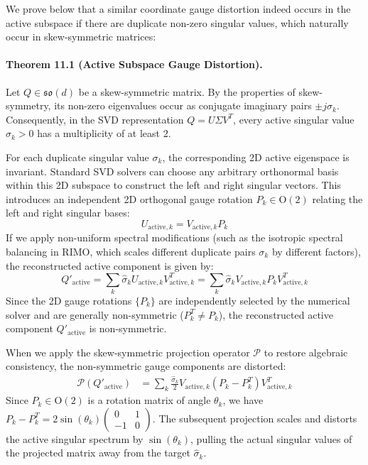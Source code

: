 We prove below that a similar coordinate gauge distortion indeed occurs in the active subspace if there are duplicate non-zero singular values, which naturally occur in skew-symmetric matrices:
\paragraph{Theorem 11.1 (Active Subspace Gauge Distortion).}
Let $Q \in \mathfrak{so}(d)$ be a skew-symmetric matrix. By the properties of skew-symmetry, its non-zero eigenvalues occur as conjugate imaginary pairs $\pm j \sigma_k$. Consequently, in the SVD representation $Q = U \Sigma V^T$, every active singular value $\sigma_k > 0$ has a multiplicity of at least $2$. 

For each duplicate singular value $\sigma_k$, the corresponding 2D active eigenspace is invariant. Standard SVD solvers can choose any arbitrary orthonormal basis within this 2D subspace to construct the left and right singular vectors. This introduces an independent 2D orthogonal gauge rotation $P_k \in \mathrm{O}(2)$ relating the left and right singular bases:
\begin{equation}
U_{\text{active}, k} = V_{\text{active}, k} P_k
\end{equation}
If we apply non-uniform spectral modifications (such as the isotropic spectral balancing in RIMO, which scales different duplicate pairs $\sigma_k$ by different factors), the reconstructed active component is given by:
\begin{equation}
Q'_{\text{active}} = \sum_k \hat{\sigma}_k U_{\text{active}, k} V_{\text{active}, k}^T = \sum_k \hat{\sigma}_k V_{\text{active}, k} P_k V_{\text{active}, k}^T
\end{equation}
Since the 2D gauge rotations $\{P_k\}$ are independently selected by the numerical solver and are generally non-symmetric ($P_k^T \ne P_k$), the reconstructed active component $Q'_{\text{active}}$ is non-symmetric. 

When we apply the skew-symmetric projection operator $\mathcal{P}$ to restore algebraic consistency, the non-symmetric gauge components are distorted:
\begin{align}
\mathcal{P}(Q'_{\text{active}}) &= \sum_k \frac{\hat{\sigma}_k}{2} V_{\text{active}, k} (P_k - P_k^T) V_{\text{active}, k}^T
\end{align}
Since $P_k \in \mathrm{O}(2)$ is a rotation matrix of angle $\theta_k$, we have $P_k - P_k^T = 2 \sin(\theta_k) \begin{pmatrix} 0 & 1 \\ -1 & 0 \end{pmatrix}$. The subsequent projection scales and distorts the active singular spectrum by $\sin(\theta_k)$, pulling the actual singular values of the projected matrix away from the target $\hat{\sigma}_k$.

